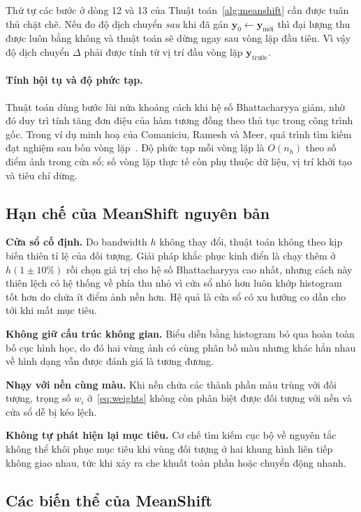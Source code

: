 \documentclass[12pt,a4paper]{article}
\numberwithin{equation}{section}
\begin{document}
Thứ tự các bước ở dòng 12 và 13 của Thuật toán~\ref{alg:meanshift} cần được tuân thủ chặt chẽ. Nếu
đo độ dịch chuyển \textit{sau} khi đã gán $\mathbf{y}_0 \leftarrow \mathbf{y}_{\text{mới}}$ thì
đại lượng thu được luôn bằng không và thuật toán sẽ dừng ngay sau vòng lặp đầu tiên. Vì vậy độ
dịch chuyển $\Delta$ phải được tính từ vị trí đầu vòng lặp $\mathbf{y}_{\text{trước}}$.

\paragraph{Tính hội tụ và độ phức tạp.} Thuật toán dùng bước lùi nửa khoảng cách khi hệ số
Bhattacharyya giảm, nhờ đó duy trì tính tăng đơn điệu của hàm tương đồng theo thủ tục trong công
trình gốc. Trong ví dụ minh hoạ của Comaniciu, Ramesh và Meer, quá trình tìm kiếm đạt nghiệm sau
bốn vòng lặp~\cite{comaniciu2003}. Độ phức tạp mỗi vòng lặp là $O(n_h)$ theo số điểm ảnh trong
cửa sổ; số vòng lặp thực tế còn phụ thuộc dữ liệu, vị trí khởi tạo và tiêu chí dừng.

\subsection{Hạn chế của MeanShift nguyên bản}

\textbf{Cửa sổ cố định.} Do bandwidth $h$ không thay đổi, thuật toán không theo kịp biến thiên tỉ
lệ của đối tượng. Giải pháp khắc phục kinh điển là chạy thêm ở $h(1\pm 10\%)$ rồi chọn giá trị cho
hệ số Bhattacharyya cao nhất, nhưng cách này thiên lệch có hệ thống về phía thu nhỏ vì cửa sổ nhỏ
hơn luôn khớp histogram tốt hơn do chứa ít điểm ảnh nền hơn. Hệ quả là cửa sổ có xu hướng co dần
cho tới khi mất mục tiêu.

\textbf{Không giữ cấu trúc không gian.} Biểu diễn bằng histogram bỏ qua hoàn toàn bố cục hình học,
do đó hai vùng ảnh có cùng phân bố màu nhưng khác hẳn nhau về hình dạng vẫn được đánh giá là tương
đương.

\textbf{Nhạy với nền cùng màu.} Khi nền chứa các thành phần màu trùng với đối tượng, trọng số
$w_i$ ở~\eqref{eq:weights} không còn phân biệt được đối tượng với nền và cửa sổ dễ bị kéo lệch.

\textbf{Không tự phát hiện lại mục tiêu.} Cơ chế tìm kiếm cục bộ về nguyên tắc không thể khôi phục
mục tiêu khi vùng đối tượng ở hai khung hình liên tiếp không giao nhau, tức khi xảy ra che khuất
toàn phần hoặc chuyển động nhanh.

\subsection{Các biến thể của MeanShift}
\end{document}
